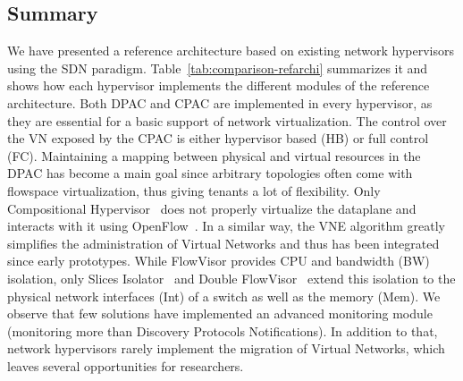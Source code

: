 \subsection{Summary}
We have presented a reference architecture based on existing network hypervisors using the SDN paradigm.
Table~\ref{tab:comparison-refarchi} summarizes it and shows how each hypervisor implements the different modules of the reference architecture.
Both DPAC and CPAC are implemented in every hypervisor, as they are essential for a basic support of network virtualization.
The control over the VN exposed by the CPAC is either hypervisor based (HB) or full control (FC).
Maintaining a mapping between physical and virtual resources in the DPAC has become a main goal since arbitrary topologies often come with flowspace virtualization, thus giving tenants a lot of flexibility.
Only Compositional Hypervisor~\cite{CompositionalHypervisor-Jin2014} does not properly virtualize the dataplane and interacts with it using OpenFlow~\cite{Openflow-McKeown2008}.
In a similar way, the VNE algorithm greatly simplifies the administration of Virtual Networks and thus has been integrated since early prototypes.
While FlowVisor provides CPU and bandwidth (BW) isolation, only Slices Isolator~\cite{SlicesIsolator-El-Azzab2011} and Double FlowVisor~\cite{DoubleFV-Yin2013} extend this isolation to the physical network interfaces (Int) of a switch as well as the memory (Mem).
We observe that few solutions have implemented an advanced monitoring module (\ie monitoring more than Discovery Protocols Notifications).
In addition to that, network hypervisors rarely implement the migration of Virtual Networks, which leaves several opportunities for researchers.


